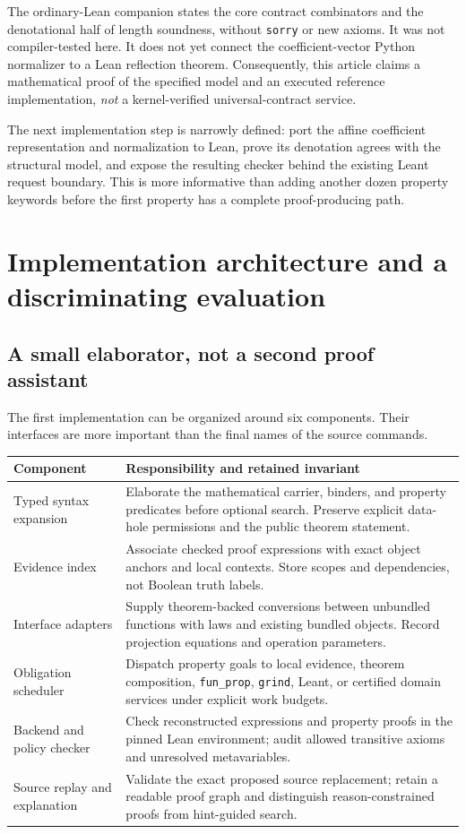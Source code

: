 \documentclass[11pt,letterpaper]{article}
\newcommand{\code}[1]{\nolinkurl{#1}}
\theoremstyle{definition}
\theoremstyle{remark}
\begin{document}
The ordinary-Lean companion states the core contract combinators and the
denotational half of length soundness, without \code{sorry} or new axioms. It was
not compiler-tested here. It does not yet connect the coefficient-vector Python
normalizer to a Lean reflection theorem. Consequently, this article claims a
mathematical proof of the specified model and an executed reference
implementation, \emph{not} a kernel-verified universal-contract service.

The next implementation step is narrowly defined: port the affine coefficient
representation and normalization to Lean, prove its denotation agrees with the
structural model, and expose the resulting checker behind the existing Leant
request boundary. This is more informative than adding another dozen property
keywords before the first property has a complete proof-producing path.

\section{Implementation architecture and a discriminating evaluation}\label{sec:implementation}

\subsection{A small elaborator, not a second proof assistant}
The first implementation can be organized around six components. Their
interfaces are more important than the final names of the source commands.

\begin{longtable}{@{}P{.24\linewidth}P{.70\linewidth}@{}}
\toprule Component & Responsibility and retained invariant\\\midrule
\endhead
Typed syntax expansion & Elaborate the mathematical carrier, binders, and
property predicates before optional search. Preserve explicit data-hole
permissions and the public theorem statement.\\
Evidence index & Associate checked proof expressions with exact object anchors
and local contexts. Store scopes and dependencies, not Boolean truth labels.\\
Interface adapters & Supply theorem-backed conversions between unbundled
functions with laws and existing bundled objects. Record projection equations
and operation parameters.\\
Obligation scheduler & Dispatch property goals to local evidence, theorem
composition, \code{fun_prop}, \code{grind}, Leant, or certified domain services
under explicit work budgets.\\
Backend and policy checker & Check reconstructed expressions and property proofs
in the pinned Lean environment; audit allowed transitive axioms and unresolved
metavariables.\\
Source replay and explanation & Validate the exact proposed source replacement;
retain a readable proof graph and distinguish reason-constrained proofs from
hint-guided search.\\\bottomrule
\end{longtable}
\end{document}
